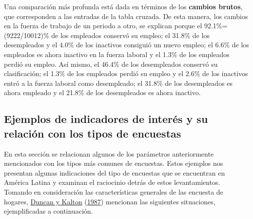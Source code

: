 \documentclass[
  12pt,
  spanish,
]{book}
\begin{document}
Una comparación más profunda está dada en términos de los \textbf{cambios brutos}, que corresponden a las entradas de la tabla cruzada. De esta manera, los cambios en la fuerza de trabajo de un periodo a otro, se explican porque el 92.1\%=(9222/10012)\% de los empleados conservó su empleo; el 31.8\% de los desempleados y el 4.0\% de los inactivos consiguió un nuevo empleo; el 6.6\% de los empleados es ahora inactivo en la fuerza laboral y el 1.3\% de los empleados perdió su empleo. Así mismo, el 46.4\% de los desempleados conservó su clasificación; el 1.3\% de los empleados perdió su empleo y el 2.6\% de los inactivos entró a la fuerza laboral como desempleado; el 31.8\% de los desempleados es ahora empleado y el 21.8\% de los desempleados es ahora inactivo.

\hypertarget{ejemplos-de-indicadores-de-interuxe9s-y-su-relaciuxf3n-con-los-tipos-de-encuestas}{%
\subsection{Ejemplos de indicadores de interés y su relación con los tipos de encuestas}\label{ejemplos-de-indicadores-de-interuxe9s-y-su-relaciuxf3n-con-los-tipos-de-encuestas}}

En esta sección se relacionan algunos de los parámetros anteriormente mencionados con los tipos más comunes de encuestas. Estos ejemplos nos presentan algunas indicaciones del tipo de encuestas que se encuentran en América Latina y examinan el raciocinio detrás de estos levantamientos. Tomando en consideración las características generales de las encuesta de hogares, \protect\hyperlink{ref-Duncan_Kalton_1987}{Duncan y Kalton} (\protect\hyperlink{ref-Duncan_Kalton_1987}{1987}) mencionan las siguientes situaciones, ejemplificadas a continuación.
\end{document}
